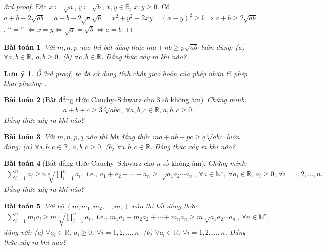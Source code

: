 \documentclass{article}
\newtheorem{baitoan}{Bài toán}
\newtheorem{luuy}{Lưu ý}
\begin{document}
\begin{proof}[3rd proof]
	Đặt $x\coloneqq\sqrt{a}$, $y\coloneqq\sqrt{b}$, $x,y\in\mathbb{R}$, $x,y\ge0$. Có $a + b - 2\sqrt{ab} = a + b - 2\sqrt{a}\sqrt{b} = x^2 + y^2 - 2xy = (x - y)^2\ge0\Rightarrow a + b\ge2\sqrt{ab}$. ``$=$'' $\Leftrightarrow x = y\Leftrightarrow\sqrt{a} = \sqrt{b}\Leftrightarrow a = b$.
\end{proof}

\begin{baitoan}
	Với $m,n,p$ nào thì bất đẳng thức $ma + nb\ge p\sqrt{ab}$ luôn đúng: (a) $\forall a,b\in\mathbb{R}$, $a,b\ge0$. (b) $\forall a,b\in\mathbb{R}$. Đẳng thức xảy ra khi nào?
\end{baitoan}

\begin{luuy}
	Ở 3rd proof, ta đã sử dụng tính chất giao hoán của phép nhân \& phép khai phương: .
\end{luuy}

\begin{baitoan}[Bất đẳng thức Cauchy--Schwarz cho 3 số không âm]
	Chứng minh:
	\begin{align*}
		\boxed{a + b + c\ge3\sqrt[3]{abc},\ \forall a,b,c\in\mathbb{R},\,a,b,c\ge 0.}
	\end{align*}
	Đẳng thức xảy ra khi nào?
\end{baitoan}

\begin{baitoan}
	Với $m,n,p,q$ nào thì bất đẳng thức $ma + nb + pc\ge q\sqrt[3]{abc}$ luôn đúng: (a) $\forall a,b,c\in\mathbb{R}$, $a,b,c\ge0$. (b) $\forall a,b,c\in\mathbb{R}$. Đẳng thức xảy ra khi nào?
\end{baitoan}

\begin{baitoan}[Bất đẳng thức Cauchy--Schwarz cho $n$ số không âm]
	Chứng minh:
	\begin{align*}
		\sum_{i=1}^n a_i\ge n\sqrt[n]{\prod_{i=1}^n a_i},\mbox{ i.e., } a_1 + a_2 + \cdots + a_n\ge\sqrt[n]{a_1a_2\cdots a_n},\ \forall n\in\mathbb{N}^\star,\ \forall a_i\in\mathbb{R},\,a_i\ge0,\,\forall i = 1,2,\ldots,n.
	\end{align*}
	Đẳng thức xảy ra khi nào?
\end{baitoan}

\begin{baitoan}
	Với bộ $(m,m_1,m_2,\ldots,m_n)$ nào thì bất đẳng thức:
	\begin{align*}
		\sum_{i=1}^n m_ia_i\ge m\sqrt[n]{\prod_{i=1}^n a_i},\mbox{ i.e., } m_1a_1 + m_2a_2 + \cdots + m_na_n\ge m\sqrt[n]{a_1a_2\cdots a_n},\ \forall n\in\mathbb{N}^\star,
	\end{align*}
	đúng với: (a) $\forall a_i\in\mathbb{R}$, $a_i\ge0$, $\forall i = 1,2,\ldots,n$. (b) $\forall a_i\in\mathbb{R}$, $\forall i = 1,2,\ldots,n$.
	Đẳng thức xảy ra khi nào?
\end{baitoan}
\end{document}
